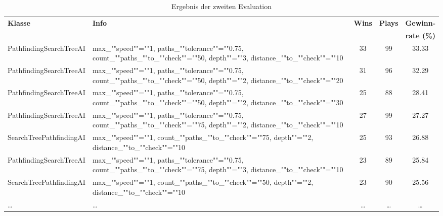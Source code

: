 \begin{table}[htb]
    \centering
    \begin{tabularx}{\textwidth}{|X|X|c|c|c|}
        \hline
		\textbf{Klasse} & \textbf{Info} & \textbf{Wins} & \textbf{Plays} & \textbf{Gewinn-} \\
                        &               &               &                & \textbf{rate (\%)} \\ \hline
        Path\-finding\-Search\-Tree\-AI & max\_""speed""=""1, paths\_""tolerance""=""0.75, count\_""paths\_""to\_""check""=""50, depth""=""3, distance\_""to\_""check""=""10 & 33 & 99 & 33.33 \\ \hline
        Path\-finding\-Search\-Tree\-AI & max\_""speed""=""1, paths\_""tolerance""=""0.75, count\_""paths\_""to\_""check""=""50, depth""=""2, distance\_""to\_""check""=""20 & 31 & 96 & 32.29 \\ \hline
        Path\-finding\-Search\-Tree\-AI & max\_""speed""=""1, paths\_""tolerance""=""0.75, count\_""paths\_""to\_""check""=""50, depth""=""2, distance\_""to\_""check""=""30 & 25 & 88 & 28.41 \\ \hline
        Path\-finding\-Search\-Tree\-AI & max\_""speed""=""1, paths\_""tolerance""=""0.75, count\_""paths\_""to\_""check""=""75, depth""=""2, distance\_""to\_""check""=""10 & 27 & 99 & 27.27 \\ \hline
        Search\-Tree\-Path\-finding\-AI & max\_""speed""=""1, count\_""paths\_""to\_""check""=""75, depth""=""2, distance\_""to\_""check""=""10 & 25 & 93 & 26.88 \\ \hline
        Path\-finding\-Search\-Tree\-AI & max\_""speed""=""1, paths\_""tolerance""=""0.75, count\_""paths\_""to\_""check""=""75, depth""=""3, distance\_""to\_""check""=""10 & 23 & 89 & 25.84 \\ \hline
        Search\-Tree\-Path\-finding\-AI & max\_""speed""=""1, count\_""paths\_""to\_""check""=""50, depth""=""2, distance\_""to\_""check""=""10 & 23 & 90 & 25.56 \\ \hline
        \ldots & \ldots & \ldots & \ldots & \ldots \\ \hline
    \end{tabularx}
    \caption{Ergebnis der zweiten Evaluation}
    \label{tab:evaluation-ki-konfiguration-zwei}
\end{table}
